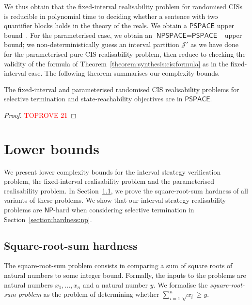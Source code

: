 \documentclass[a4paper,UKenglish,cleveref,autoref,thm-restate,colorlinks]{lipics-v2021}
\newcommand{\pspace}{\textsf{PSPACE}}
\newcommand{\npspace}{\textsf{NPSPACE}}
\newcommand{\np}{\textsf{NP}}
\newcommand{\sqsx}{x} \newcommand{\sqsxVect}{\bar{x}} \newcommand{\sqsm}{m} \newcommand{\sqsy}{y} \newcommand{\sqsi}{i} \newcommand{\sqsn}{n} \newcommand{\sqsSize}{E}
\newcommand{\intPartB}{\mathcal{J}}
\begin{document}
We thus obtain that the fixed-interval realisability problem for randomised CISs is reducible in polynomial time to deciding whether a sentence with two quantifier blocks holds in the theory of the reals.
We obtain a $\pspace$ upper bound~\cite[Rmk.~13.10]{BPR2006}.
For the parameterised case, we obtain an $\npspace = \pspace$~\cite{DBLP:journals/jcss/Savitch70} upper bound; we non-deterministically guess an interval partition $\intPartB'$ as we have done for the parameterised pure CIS realisability problem, then reduce to checking the validity of the formula of Theorem~\ref{theorem:synthesis:cis:formula} as in the fixed-interval case.
The following theorem summarises our complexity bounds.

\begin{theorem}\label{theorem:realisability:cis:randomised}
  The fixed-interval and parameterised randomised CIS realisability problems for selective termination and state-reachability objectives are in $\pspace$.
\end{theorem}
\begin{proof}\textcolor{red}{TOPROVE 21}\end{proof}

 
\section{Lower bounds}\label{section:hardness}
We present lower complexity bounds for the interval strategy verification problem, the fixed-interval realisability problem and the parameterised realisability problem.
In Section~\ref{section:hardness:sqs}, we prove the square-root-sum hardness of all variants of these problems.
We show that our interval strategy realisability problems are $\np$-hard when considering selective termination in Section~\ref{section:hardness:np}.

\subsection{Square-root-sum hardness}\label{section:hardness:sqs}
The square-root-sum problem consists in comparing a sum of square roots of natural numbers to some integer bound.
Formally, the inputs to the problems are natural numbers $\sqsx_1, \ldots, \sqsx_\sqsn$ and a natural number $\sqsy$.
We formalise the \textit{square-root-sum problem} as the problem of determining whether $\sum_{\sqsi=1}^\sqsn\sqrt{\sqsx_\sqsi}\geq\sqsy$.
\end{document}
